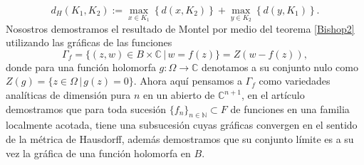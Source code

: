 \documentclass[letterpaper]{report}
\newcommand{\nat}{\ensuremath{ \mathbb N }}
\newcommand{\co}{\ensuremath{\mathbb C }}
\begin{document}
\[
        d_H(K_1,K_2):= \max_{x\in K_1}\left\{d(x,K_2)\right\}+\max_{y\in K_2}\left\{d(y,K_1)\right\}. 
\]
Nosostros demostramos el resultado de Montel por medio del teorema \ref{Bishop2} utilizando las gr\'aficas de las
funciones 
\[
        \Gamma_{f}=\{(z,w)\in B\times\co\,|\,w=f(z)\}=Z(w-f(z)),
\]
\noindent donde para una funci\'on holomorfa $g:\Omega\rightarrow\co$ denotamos a su conjunto nulo como $Z(g)=\{z\in\Omega\,|\,g(z)=0\}$. Ahora aqu\'i 
pensamos a $\Gamma_{f}$ como variedades anal\'iticas de dimensi\'on pura $n$ en un abierto de $\co^{n+1}$, en el art\'iculo demostramos 
que para toda sucesi\'on $\{f_n\}_{n\in\nat}\subset F$ de funciones en una familia localmente acotada, tiene una subsucesi\'on 
cuyas gr\'aficas convergen en el sentido de la m\'etrica de Hausdorff, adem\'as demostramos que su conjunto l\'imite 
es a su vez la gr\'afica de una funci\'on holomorfa en $B$.
\end{document}
